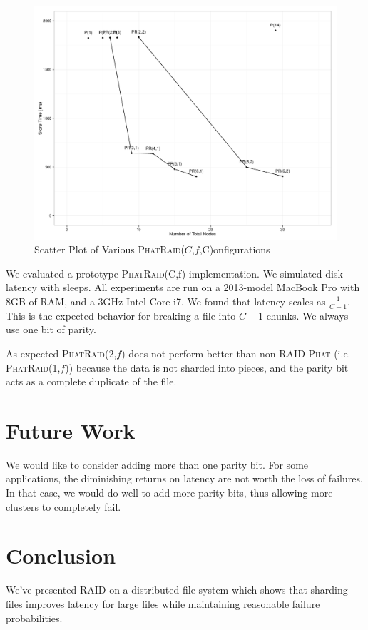\documentclass[10pt,letter]{article}
\newcommand{\phat}[0]{\textsc{Phat}}
\newcommand{\phatraidcf}[2]{\textsc{PhatRaid}(#1,#2)}
\begin{document}
\begin{figure}
  \includegraphics[scale=0.45]{Store.pdf}
  \caption{Scatter Plot of Various \phatraidcf{$C$,$f$} Configurations}
  \label{fig:plot}
\end{figure}

We evaluated a prototype \phatraidcf{C}{f} implementation. We simulated disk
latency with sleeps. All experiments are run on a 2013-model MacBook Pro with
8GB of RAM, and a 3GHz Intel Core i7. We found that latency scales as
$\frac{1}{C-1}$. This is the expected behavior for breaking a file into $C-1$
chunks. We always use one bit of parity.

As expected \phatraidcf{2}{$f$} does not perform better than non-RAID \phat{}
(i.e. \phatraidcf{1}{$f$}) because the data is not sharded into pieces, and the
parity bit acts as a complete duplicate of the file.

\section{Future Work}

We would like to consider adding more than one parity bit. For some
applications, the diminishing returns on latency are not worth the loss of
failures. In that case, we would do well to add more parity bits, thus allowing
more clusters to completely fail.

\section{Conclusion}

We've presented RAID on a distributed file system which shows that sharding
files improves latency for large files while maintaining reasonable failure
probabilities.



\end{document}
